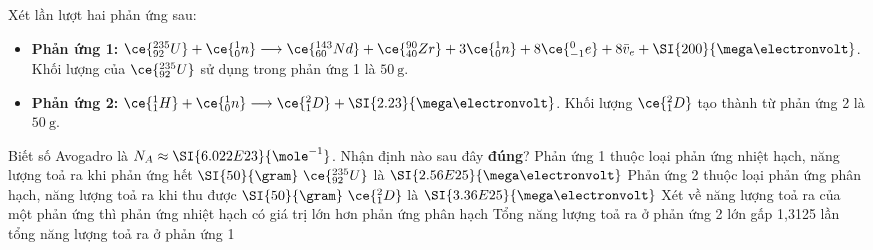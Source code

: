 \begin{ex}
	Xét lần lượt hai phản ứng sau:
	\begin{itemize}
		\item \textbf{Phản ứng 1:} $\ce{_{92}^{235}U}+\ce{_0^1n} \longrightarrow\ce{_{60}^{143}Nd}+\ce{_{40}^{90}Zr}+3\ce{_0^1n}+8\ce{_{-1}^0e}+8 \bar{v}_{e}+\SI{200}{\mega\electronvolt}$. Khối lượng của $\ce{_{92}^{235}U}$ sử dụng trong phản ứng 1 là $\SI{50}{\gram}$.
		\item \textbf{Phản ứng 2:} $\ce{_1^1H}+\ce{_0^1n} \longrightarrow \ce{_1^2D}+\SI{2.23}{\mega\electronvolt}$. Khối lượng $\ce{_1^2D}$ tạo thành từ phản ứng 2 là $\SI{50}{\gram}$.	
	\end{itemize}
	Biết số Avogadro là $N_{A} \approx \SI{6.022E23}{\mole^{-1}}$.
	Nhận định nào sau đây \textbf{đúng}?
	\choice
	{Phản ứng 1 thuộc loại phản ứng nhiệt hạch, năng lượng toả ra khi phản ứng hết $\SI{50}{\gram}\ \ce{_{92}^{235}U}$ là $\SI{2.56E25}{\mega\electronvolt}$}
	{Phản ứng 2 thuộc loại phản ứng phân hạch, năng lượng toả ra khi thu được $\SI{50}{\gram}\  \ce{_1^2D}$ là $\SI{3.36E25}{\mega\electronvolt}$}
	{Xét về năng lượng toả ra của một phản ứng thì phản ứng nhiệt hạch có giá trị lớn hơn phản ứng phân hạch}
	{\True Tổng năng lượng toả ra ở phản ứng 2 lớn gấp 1,3125 lần tổng năng lượng toả ra ở phản ứng 1}
\end{ex}
